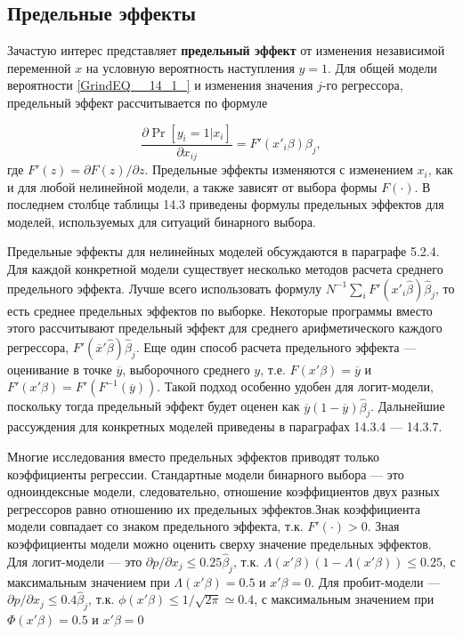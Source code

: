  

\subsection{Предельные эффекты}

Зачастую интерес представляет \textbf{предельный эффект} от изменения независимой переменной $x$ на условную вероятность наступления $y=1$. Для общей модели вероятности \eqref{GrindEQ__14_1_} и изменения значения $j$-го регрессора,  предельный эффект рассчитывается по формуле

\begin{equation} 
\label{GrindEQ__14_2_} 
\frac{\partial \Pr[y_i=1|x_i]}{\partial x_{ij}}=F'\left(x'_i\beta \right)\beta_j,  
\end{equation} 
где $F'\left(z\right)=\partial F(z)/\partial z$. Предельные эффекты изменяются с  изменением $x_i$, как и для любой нелинейной модели, а также зависят от выбора формы $F(\cdot )$. В последнем столбце таблицы 14.3 приведены формулы предельных эффектов для моделей,  используемых для ситуаций бинарного выбора.

Предельные эффекты для нелинейных моделей обсуждаются в параграфе 5.2.4. Для каждой конкретной модели существует несколько методов расчета среднего предельного эффекта. Лучше всего использовать формулу $N^{-1}\sum_i F'(x'_i\widehat\beta) \widehat\beta_j$,  то есть среднее предельных эффектов по выборке. Некоторые программы вместо этого  рассчитывают предельный эффект для среднего арифметического каждого регрессора, $F'( \overline{x}' \widehat\beta) \widehat\beta_j$. Еще один способ расчета предельного эффекта --- оценивание в точке  $\overline{y}$, выборочного среднего $y$, т.е. $F(x'\beta)=\overline{y}$ и $F'(x'\beta)=F'(F^{-1}(\overline{y}))$. Такой подход особенно удобен для логит-модели,  поскольку тогда предельный эффект будет оценен как $\overline{y}(1-\overline{y}){\widehat\beta}_j$. Дальнейшие рассуждения для конкретных моделей приведены в параграфах 14.3.4 --- 14.3.7.

Многие исследования вместо предельных эффектов  приводят только коэффициенты регрессии. Стандартные модели бинарного выбора --- это одноиндексные модели,  следовательно,  отношение коэффициентов двух разных регрессоров равно отношению их предельных эффектов.Знак коэффициента  модели совпадает со знаком предельного эффекта, т.к. $F'(\cdot)>0$. Зная коэффициенты модели можно оценить сверху  значение предельных эффектов. Для логит-модели --- это $\partial p/ \partial x_j \le 0.25\widehat\beta_j$, т.к. $\Lambda (x'\beta) (1-\Lambda (x'\beta)) \le 0.25$, с максимальным значением при $\Lambda (x'\beta)=0.5$ и $x'\beta=0$. Для пробит-модели --- $\partial p/\partial x_j \le 0.4 \widehat\beta_j$, т.к. $\phi(x'\beta)\le 1/\sqrt{2\pi} \simeq 0.4$,  с максимальным значением при $\Phi (x'\beta)=0.5$ и $x'\beta =0$

